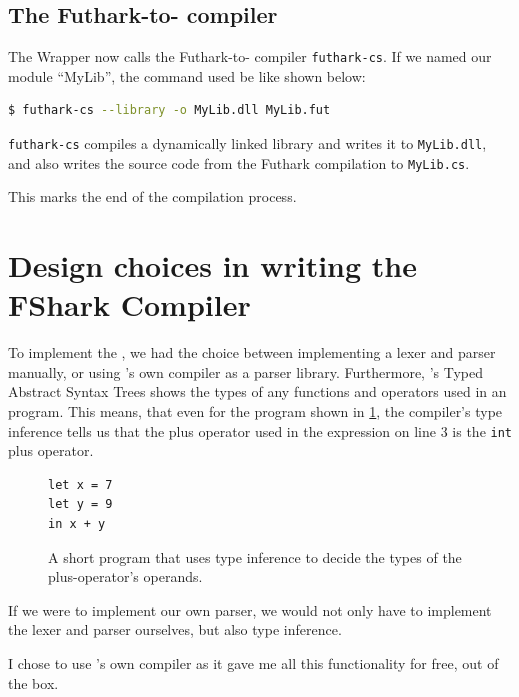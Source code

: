 \subsection{The Futhark-to-\csharp{} compiler}
The \fshark{}Wrapper now calls the Futhark-to-\csharp{} compiler
\texttt{futhark-cs}. If we named our \fshark{} module ``MyLib'', the command
used be like shown below:\\
\begin{lstlisting}[language=sh]
$ futhark-cs --library -o MyLib.dll MyLib.fut
\end{lstlisting}

\texttt{futhark-cs} compiles a \csharp{} dynamically linked library and writes
it to \texttt{MyLib.dll}, and also writes the \csharp{} source code from the
Futhark compilation to \texttt{MyLib.cs}.

This marks the end of the \fshark{} compilation process.


\section{Design choices in writing the FShark Compiler}
To implement the \fsharkcompiler{}, we had the choice between implementing a
lexer and parser manually, or using \fsharp{}'s own compiler as a parser library.
Furthermore, \fsharp{}'s Typed Abstract Syntax Trees shows the types of any
functions and operators used in an \fsharp{} program. This means, that even for
the program shown in \ref{fig:shortprogrammmm}, the \fharp{} compiler's type
inference tells us that the plus operator used in the expression on line 3 is
the \texttt{int} plus operator.

\begin{figure}[H]
  \centering
\begin{verbatim}
let x = 7
let y = 9
in x + y
\end{verbatim}
  \caption{A short \fsharp{} program that uses type inference to decide the
    types of the plus-operator's operands.}
  \label{fig:shortprogrammmm}
\end{figure}
If we were to implement our own \fsharp{} parser, we would not only have to
implement the lexer and parser ourselves, but also type inference.

I chose to use \fsharp{}'s own compiler as it gave me all this functionality for
free, out of the box.

\clearpage
